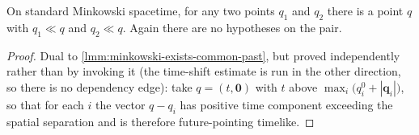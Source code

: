 \begin{lemma}
    \label{lmm:minkowski-exists-common-future}
    \leanok
    On standard Minkowski spacetime, for any two points $q_1$ and $q_2$ there is a point $q$ with $q_1 \ll q$ and $q_2 \ll q$. Again there are no hypotheses on the pair.
\end{lemma}
\begin{proof}
    \leanok
    Dual to \ref{lmm:minkowski-exists-common-past}, but proved independently rather than by invoking it (the time-shift estimate is run in the other direction, so there is no dependency edge): take $q = (t, \mathbf{0})$ with $t$ above $\max_i\bigl(q_i^0 + |\mathbf{q}_i|\bigr)$, so that for each $i$ the vector $q - q_i$ has positive time component exceeding the spatial separation and is therefore future-pointing timelike.
\end{proof}

